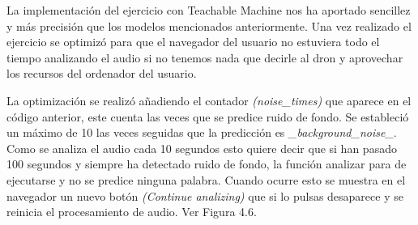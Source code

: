 La implementación del ejercicio con Teachable Machine  nos ha aportado sencillez y más precisión que los modelos mencionados anteriormente.
Una vez realizado el ejercicio se optimizó para que el navegador del usuario no estuviera todo el tiempo analizando el  audio si no tenemos nada que decirle al dron y aprovechar los recursos del ordenador del usuario.

La optimización se realizó añadiendo el contador \textit{(noise\_times)} que aparece en el código anterior, este cuenta las veces que se predice ruido de fondo. Se estableció un máximo de 10 las veces seguidas que la predicción es \textit{\_background\_noise\_}. Como se analiza el audio cada 10 segundos esto quiere decir que si han pasado 100 segundos y siempre ha detectado ruido de fondo, la función analizar para de ejecutarse y no se predice ninguna palabra. Cuando ocurre esto se muestra en el navegador un nuevo botón \textit{(Continue analizing)} que  si lo pulsas desaparece y se reinicia el procesamiento de audio. Ver Figura 4.6.

